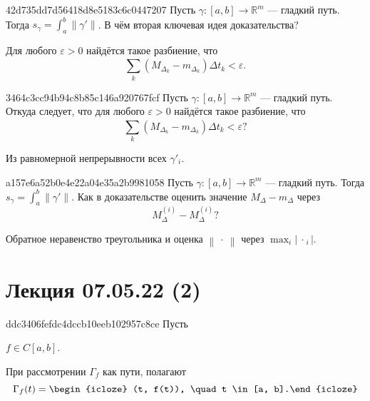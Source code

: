 \begin{note}{42d735dd7d56418d8e5183c6c0447207}
    Пусть \({ \gamma : [a, b] \to \mathbb R^{m} }\) --- гладкий путь.
    Тогда \({ s_\gamma = \int_{a}^{b} \left\lVert \gamma' \right\rVert }\).
    В чём вторая ключевая идея доказательства?

    \begin{cloze}{1}
        Для любого \({ \varepsilon > 0 }\) найдётся такое разбиение, что
        \[
            \sum_{k}^{} (M_{\Delta_k} - m_{\Delta_k}) \Delta t_k < \varepsilon.
        \]
    \end{cloze}
\end{note}

\begin{note}{3464c3cc94b94c8b85c146a920767fcf}
    Пусть \({ \gamma : [a, b] \to \mathbb R^{m} }\) --- гладкий путь.
    Откуда следует, что для любого \({ \varepsilon > 0 }\) найдётся такое разбиение, что
    \[
        \sum_{k}^{} (M_{\Delta_k} - m_{\Delta_k}) \Delta t_k < \varepsilon?
    \]

    \begin{cloze}{1}
        Из равномерной непрерывности всех \({ \gamma'_i }\).
    \end{cloze}
\end{note}

\begin{note}{a157e6a52b0e4e22a04e35a2b9981058}
    Пусть \({ \gamma : [a, b] \to \mathbb R^{m} }\) --- гладкий путь.
    Тогда \({ s_\gamma = \int_{a}^{b} \left\lVert \gamma' \right\rVert }\).
    Как в доказательстве оценить значение \({ M_{\Delta} - m_{\Delta} }\) через
    \[
        M^{(i)}_{\Delta} - M^{(i)}_{\Delta}?
    \]

    \begin{cloze}{1}
        Обратное неравенство треугольника и оценка \({ \left\lVert \:\cdot\: \right\rVert }\) через \({ \displaystyle \max_i \left\lvert {\:\cdot\:}_i \right\rvert }\).
    \end{cloze}
\end{note}

\section{Лекция 07.05.22 (2)}
\begin{note}{ddc3406fefdc4dccb10eeb102957c8ce}
    Пусть \begin{icloze}{2}\({ f \in C[a, b] }\).\end{icloze}
    При рассмотрении \({ \Gamma_f }\) как пути, полагают
    \[
        \Gamma_f (t) = \begin{icloze}{1}(t, f(t)), \quad t \in [a, b].\end{icloze}
    \]
\end{note}

